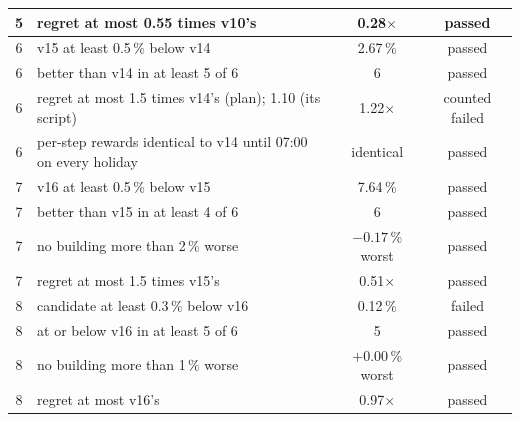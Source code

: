 \documentclass{article}
\begin{document}
\begin{table}[!htb]
\begin{tabular}{clcc}
5 & regret at most 0.55 times v10's & 0.28$\times$ & passed\\\midrule
6 & v15 at least 0.5\,\% below v14 & 2.67\,\% & passed\\
6 & better than v14 in at least 5 of 6 & 6 & passed\\
6 & regret at most 1.5 times v14's (plan); 1.10 (its script) & 1.22$\times$ & counted failed\\
6 & per-step rewards identical to v14 until 07:00 on every holiday & identical & passed\\\midrule
7 & v16 at least 0.5\,\% below v15 & 7.64\,\% & passed\\
7 & better than v15 in at least 4 of 6 & 6 & passed\\
7 & no building more than 2\,\% worse & $-0.17$\,\% worst & passed\\
7 & regret at most 1.5 times v15's & 0.51$\times$ & passed\\\midrule
8 & candidate at least 0.3\,\% below v16 & 0.12\,\% & failed\\
8 & at or below v16 in at least 5 of 6 & 5 & passed\\
8 & no building more than 1\,\% worse & $+0.00$\,\% worst & passed\\
8 & regret at most v16's & 0.97$\times$ & passed\\\bottomrule
\end{tabular}
\end{table}
\end{document}
